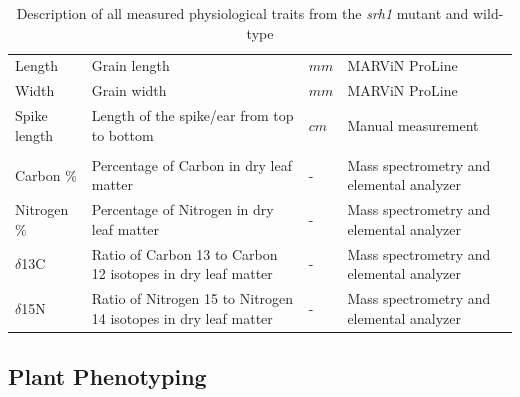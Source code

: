 \documentclass{article}
\begin{document}
\begin{table}[ht]
\begin{adjustbox}
\begin{tabular}{@{}llll@{}}
			Length                  & Grain length                                                                               & $mm$                                         & MARViN ProLine                                       \\
			Width                   & Grain width                                                                                & $mm$                                         & MARViN ProLine                                       \\
			Spike length            & Length of the spike/ear from top to bottom                                                 & $cm$                                         & Manual measurement                                   \\
			                        &                                                                                            &                                              &                                                      \\
			Carbon \%               & Percentage of Carbon in dry leaf matter                                                    & -                                            & Mass spectrometry and elemental analyzer             \\
			Nitrogen \%             & Percentage of Nitrogen in dry leaf matter                                                  & -                                            & Mass spectrometry and elemental analyzer             \\
			$\delta$13C             & Ratio of Carbon 13 to Carbon 12 isotopes in dry leaf matter                                & -                                            & Mass spectrometry and elemental analyzer             \\
			$\delta$15N             & Ratio of Nitrogen 15 to Nitrogen 14 isotopes in dry leaf matter                            & -                                            & Mass spectrometry and elemental analyzer             \\ \bottomrule
		\end{tabular}
	\end{adjustbox}
	\caption{Description of all measured physiological traits from the \textit{srh1} mutant and wild-type }
	\label{physiology_traits_table}
\end{table}


\subsection{Plant Phenotyping}
\end{document}
